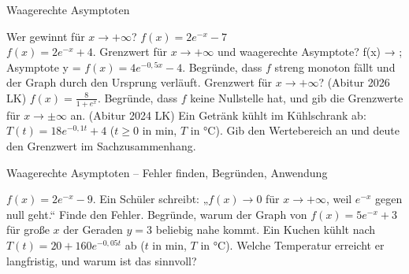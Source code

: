 \setcounter{aufgabe}{14}

\begin{aufgabe}{Waagerechte Asymptoten}
\begin{teile}
\teil Wer gewinnt für $x \to +\infty$? $f(x) = 2e^{-x} - 7$  \\ 
\teil $f(x) = 2e^{-x} + 4$. Grenzwert für $x \to +\infty$ und waagerechte Asymptote? f(x) → \leerfeld ; Asymptote y = \leerfeld
\teil $f(x) = 4e^{-0{,}5x} - 4$. Begründe, dass $f$ streng monoton fällt und der Graph durch den Ursprung verläuft. Grenzwert für $x \to +\infty$? \hfill (Abitur 2026 LK)
\teil $f(x) = \frac{8}{1 + e^{x}}$. Begründe, dass $f$ keine Nullstelle hat, und gib die Grenzwerte für $x \to \pm\infty$ an. \hfill (Abitur 2024 LK)
\teil Ein Getränk kühlt im Kühlschrank ab: $T(t) = 18e^{-0{,}1t} + 4$ ($t \ge 0$ in min, $T$ in °C). Gib den Wertebereich an und deute den Grenzwert im Sachzusammenhang.
\end{teile}
\end{aufgabe}

\begin{aufgabe}{Waagerechte Asymptoten – Fehler finden, Begründen, Anwendung}
\begin{teile}
\teil $f(x) = 2e^{-x} - 9$. Ein Schüler schreibt: „$f(x) \to 0$ für $x \to +\infty$, weil $e^{-x}$ gegen null geht.“ Finde den Fehler.
\teil Begründe, warum der Graph von $f(x) = 5e^{-x} + 3$ für große $x$ der Geraden $y = 3$ beliebig nahe kommt.
\teil Ein Kuchen kühlt nach $T(t) = 20 + 160e^{-0{,}05t}$ ab ($t$ in min, $T$ in °C). Welche Temperatur erreicht er langfristig, und warum ist das sinnvoll?
\end{teile}
\end{aufgabe}

